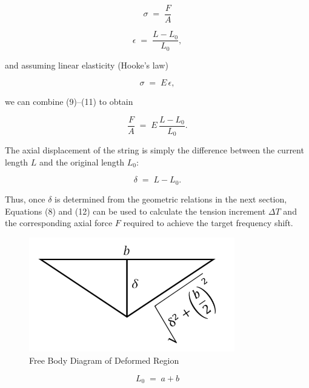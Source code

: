 \documentclass[12pt]{article}
\theoremstyle{definition} %
\theoremstyle{plain} %
\begin{document}
\begin{equation}
  \sigma \;=\; \frac{F}{A}
  \tag{9}
\end{equation}

\begin{equation}
  \epsilon \;=\; \frac{L - L_0}{L_0},
  \tag{10}
\end{equation}

and assuming linear elasticity (Hooke’s law)

\begin{equation}
  \sigma \;=\; E\,\epsilon,
  \tag{11}
\end{equation}

we can combine (9)–(11) to obtain

\begin{equation}
  \frac{F}{A}
    \;=\;
  E\,\frac{L - L_0}{L_0}.
  \tag{12}
\end{equation}

The axial displacement of the string is simply the difference between the
current length $L$ and the original length $L_0$:

\begin{equation}
  \delta \;=\; L - L_0.
  \tag{13}
\end{equation}

Thus, once $\delta$ is determined from the geometric relations in the
next section, Equations (8) and (12) can be used to calculate the tension
increment $\Delta T$ and the corresponding axial force $F$ required to
achieve the target frequency shift.

\begin{figure}[htbp]
  \centering
  \includegraphics[width=0.8\textwidth]{classes/Mathematics-of-Guitar-Strings/06-10/fgs/fig14.png}
  \caption{Free Body Diagram of Deformed Region}
  \label{fig:}
\end{figure}
\begin{equation}
  L_0 \;=\; a + b
  \tag{14}
\end{equation}
\end{document}
